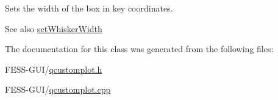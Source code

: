 Sets the width of the box in key coordinates.

\begin{DoxySeeAlso}{See also}
\hyperlink{class_q_c_p_statistical_box_adf378812446bd66f34d1f7f293d991cd}{set\+Whisker\+Width} 
\end{DoxySeeAlso}


The documentation for this class was generated from the following files\+:\begin{DoxyCompactItemize}
\item 
F\+E\+S\+S-\/\+G\+U\+I/\hyperlink{qcustomplot_8h}{qcustomplot.\+h}\item 
F\+E\+S\+S-\/\+G\+U\+I/\hyperlink{qcustomplot_8cpp}{qcustomplot.\+cpp}\end{DoxyCompactItemize}
